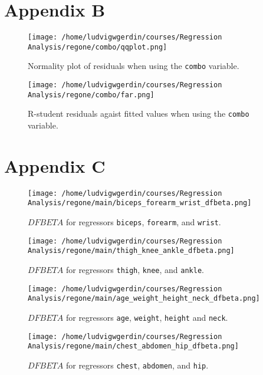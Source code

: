 \documentclass[11pt]{article}
\begin{document}
\section{Appendix B}
\label{sec:org1927ccf}

\begin{figure}[H]
\centering
\texttt{[image: /home/ludvigwgerdin/courses/Regression Analysis/regone/combo/qqplot.png]}
\caption{Normality plot of residuals when using the \texttt{combo} variable.}
\end{figure}

\begin{figure}[H]
\centering
\texttt{[image: /home/ludvigwgerdin/courses/Regression Analysis/regone/combo/far.png]}
\caption{R-student residuals agaist fitted values when using the \texttt{combo} variable.}
\end{figure}



\section{Appendix C}
\label{sec:org39accf5}

\begin{figure}[H]
\centering
\texttt{[image: /home/ludvigwgerdin/courses/Regression Analysis/regone/main/biceps\_forearm\_wrist\_dfbeta.png]}
\caption{\label{fig:orgb6b7b29}
\(DFBETA\) for regressors \texttt{biceps}, \texttt{forearm}, and \texttt{wrist}.}
\end{figure}

\begin{figure}[H]
\centering
\texttt{[image: /home/ludvigwgerdin/courses/Regression Analysis/regone/main/thigh\_knee\_ankle\_dfbeta.png]}
\caption{\label{fig:org87d9548}
\(DFBETA\) for regressors \texttt{thigh}, \texttt{knee}, and \texttt{ankle}.}
\end{figure}

\begin{figure}[H]
\centering
\texttt{[image: /home/ludvigwgerdin/courses/Regression Analysis/regone/main/age\_weight\_height\_neck\_dfbeta.png]}
\caption{\label{fig:orgff26fa3}
\(DFBETA\) for regressors \texttt{age}, \texttt{weight}, \texttt{height} and \texttt{neck}.}
\end{figure}

\begin{figure}[H]
\centering
\texttt{[image: /home/ludvigwgerdin/courses/Regression Analysis/regone/main/chest\_abdomen\_hip\_dfbeta.png]}
\caption{\label{fig:org48879c3}
\(DFBETA\) for regressors \texttt{chest}, \texttt{abdomen}, and \texttt{hip}.}
\end{figure}

\newpage




\end{document}
